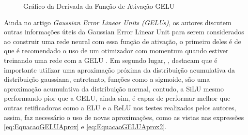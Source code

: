 \begin{figure}[htbp]
    \centering
    \caption{Gráfico da Derivada da Função de Ativação GELU}
    \label{fig:GraficoGELUDerivada}
\end{figure}

Ainda no artigo \textit{Gaussian Error Linear Units (GELUs)}, os autores discutem outras informações úteis da Gaussian Error Linear Unit para serem considerados ao construir uma rede neural com essa função de ativação, o primeiro deles é de que é recomendado o uso de um otimizador com momentum quando estiver treinando uma rede com a GELU \parencite{gelu}. Em segundo lugar, \textcite{gelu}, destacam que é importante utilizar uma aproximação próxima da distribuição acumulativa da distribuição gaussiana, entretanto, funções como a sigmoide, são uma aproximação acumulativa da distribuição normal, contudo, a SiLU mesmo performando pior que a GELU, ainda sim, é capaz de performar melhor que outras retificadoras como a ELU e a ReLU nos testes realizados pelos autores, assim, faz necessário o uso de novas aproximações, como as vistas nas expressões \ref{eq:EquacaoGELUAprox} e \ref{eq:EquacaoGELUAprox2}.